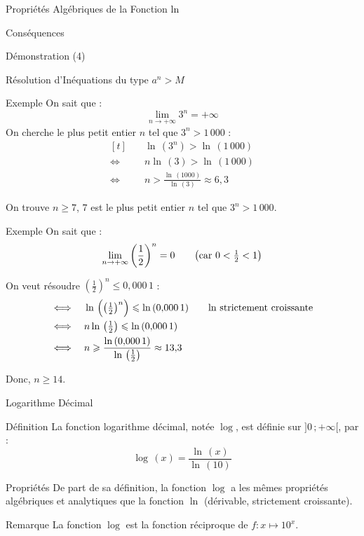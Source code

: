\documentclass{coursbook}
\begin{document}
\begin{Gpartie}{Propriétés Algébriques de la Fonction ln}
\begin{Spartie}{Conséquences}
\begin{enumerate}[(1)]
\begin{SSpartie}{Démonstration (4)}
                \end{SSpartie}
            \end{enumerate}
        \end{Spartie}
    \end{Gpartie}
    \begin{Gpartie}{Résolution d'Inéquations du type $a^n>M$}
        \begin{Spartie}{Exemple}
            On sait que : \[\lim_{n\to+\infty}3^n=+\infty\]
            On cherche le plus petit entier $n$ tel que $3^n>1\,000$ :
            \[\begin{aligned}[t]
                &\quad\ln\,\left(3^n\right)>\ln\,(1\,000) \\
                \iff&\quad n\ln\,(3)>\ln\,(1\,000) \\
                \iff&\quad n>\frac{\ln\,(1000)}{\ln\,(3)}\approx 6{,}3
            \end{aligned}\]

            On trouve $n\geq 7$, $7$ est le plus petit entier $n$ tel que $3^n>1\,000$.
        \end{Spartie}
        \begin{Spartie}{Exemple}
            On sait que : \[\lim_{n\to+\infty}\left(\frac{1}{2}\right)^n=0\text{\qquad \big(car $0<\tfrac{1}{2}<1$\big)}\]
            
            On veut résoudre $\left(\frac{1}{2}\right)^n\leq 0{,}000\,1$ :
            \[\begin{aligned}[t]
                \iff&\quad\ln\,\Big(\big(\tfrac{1}{2}\big)^n\Big)\leq\ln\,(0{,}000\,1)\text{\qquad $\ln$ strictement croissante} \\
                \iff&\quad n\ln\,\big(\tfrac{1}{2}\big)\leq\ln\,(0{,}000\,1) \\
                \iff&\quad n\geq\frac{\ln\,(0{,}000\,1)}{\ln\,\left(\frac{1}{2}\right)}\approx13{,}3
            \end{aligned}\]

            Donc, $n\geq 14$.
        \end{Spartie}
    \end{Gpartie}
    \begin{Gpartie}{Logarithme Décimal} 
        \begin{Spartie}{Définition} 
            La fonction logarithme décimal, notée $\log$, est définie sur $\big]0\,;+\infty\big[$, par :
            \[\log\,(x)=\frac{\ln\,(x)}{\ln\,(10)}\]
        \end{Spartie}
        \begin{Spartie}{Propriétés} 
            De part de sa définition, la fonction $\log$ a les mêmes propriétés algébriques et analytiques que la fonction $\ln$ (dérivable, strictement croissante).
        \end{Spartie}
        \begin{Spartie}{Remarque} 
            La fonction $\log$ est la fonction réciproque de $f:x\mapsto 10^x$.
        \end{Spartie}
    \end{Gpartie}
\end{document}
